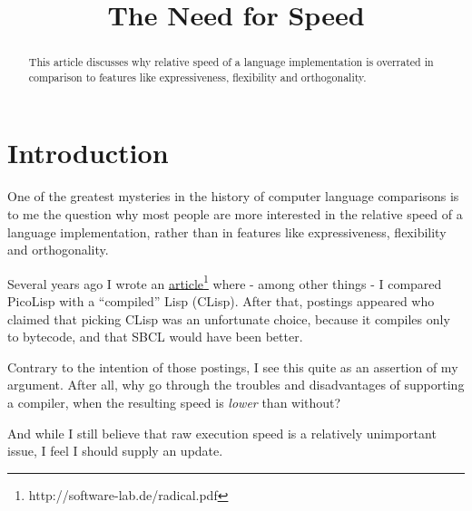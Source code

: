 \title{The Need for Speed}

\maketitle





% 

\begin{abstract}
  This article discusses why relative speed of a language
  implementation is overrated in comparison to features like
  expressiveness, flexibility and orthogonality.
\end{abstract}

\section{Introduction}
\label{sec:need-speed-introduction}

One of the greatest mysteries in the history of computer language comparisons is
to me the question why most people are more interested in the relative speed of
a language implementation, rather than in features like expressiveness,
flexibility and orthogonality.

Several years ago I wrote an \underline{article}\footnote{http://software-lab.de/radical.pdf} where
- among other things - I compared PicoLisp with a ``compiled'' Lisp (CLisp). After
that, postings appeared who claimed that picking CLisp was an unfortunate
choice, because it compiles only to bytecode, and that SBCL would have been
better.

Contrary to the intention of those postings, I see this quite as an assertion of
my argument. After all, why go through the troubles and disadvantages of
supporting a compiler, when the resulting speed is \textit{lower} than without?

And while I still believe that raw execution speed is a relatively unimportant
issue, I feel I should supply an update.

